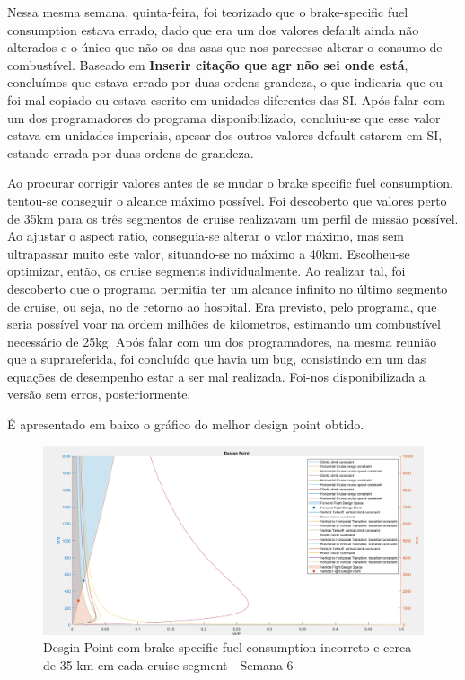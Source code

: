Nessa mesma semana, quinta-feira, foi teorizado que o brake-specific fuel consumption estava errado, dado que era um dos valores default ainda não alterados e o único que não os das asas que nos parecesse alterar o consumo de combustível. Baseado em \textbf{{\Large Inserir citação que agr não sei onde está}}, concluímos que estava errado por duas ordens grandeza, o que indicaria que ou foi mal copiado ou estava escrito em unidades diferentes das SI. Após falar com um dos programadores do programa disponibilizado, concluiu-se que esse valor estava em unidades imperiais, apesar dos outros valores default estarem em SI, estando errada por duas ordens de grandeza.\par
Ao procurar corrigir valores antes de se mudar o brake specific fuel consumption, tentou-se conseguir o alcance máximo possível. Foi descoberto que valores perto de 35km para os três segmentos de cruise realizavam um perfil de missão possível. Ao ajustar o aspect ratio, conseguia-se alterar o valor máximo, mas sem ultrapassar muito este valor, situando-se no máximo a 40km. Escolheu-se optimizar, então, os cruise segments individualmente. Ao realizar tal, foi descoberto que o programa permitia ter um alcance infinito no último segmento de cruise, ou seja, no de retorno ao hospital. Era previsto, pelo programa, que seria possível voar na ordem milhões de kilometros, estimando um combustível necessário de 25kg. Após falar com um dos programadores, na mesma reunião que a suprareferida, foi concluído que havia um bug, consistindo em um das equações de desempenho estar a ser mal realizada. Foi-nos disponibilizada a versão sem erros, posteriormente.\par
É apresentado em baixo o gráfico do melhor design point obtido.
\FloatBarrier
\begin{figure}[h]
    \centering
    \includegraphics[width=\textwidth]{Imagens/semana6_com_brake_specific_incorreto_designpoint.PNG}
    \caption{Desgin Point com brake-specific fuel consumption incorreto e cerca de 35 km em cada cruise segment - Semana 6}
    \label{designpoint_plot_semana6_correto_specifc_fuel consumption}
\end{figure}
\FloatBarrier

